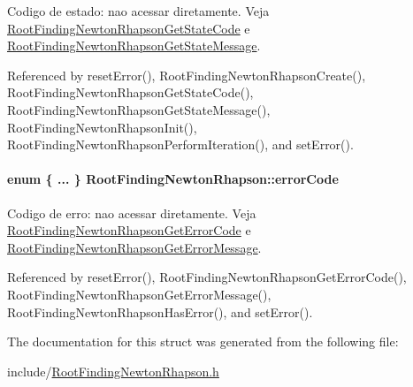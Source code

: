 Codigo de estado: nao acessar diretamente. Veja \hyperlink{group____newton_g9d87a4beccc7b61365f6b680fc1a4355}{RootFindingNewtonRhapsonGetStateCode} e \hyperlink{group____newton_g70436f650ac07866bb8d9897908f4422}{RootFindingNewtonRhapsonGetStateMessage}. 



Referenced by resetError(), RootFindingNewtonRhapsonCreate(), RootFindingNewtonRhapsonGetStateCode(), RootFindingNewtonRhapsonGetStateMessage(), RootFindingNewtonRhapsonInit(), RootFindingNewtonRhapsonPerformIteration(), and setError().\hypertarget{structRootFindingNewtonRhapson_b35a21e9345d1da0984870793a883ff9}{
\paragraph[errorCode]{\setlength{\rightskip}{0pt plus 5cm}enum \{ ... \}   {\bf RootFindingNewtonRhapson::errorCode}}\hfill}
\label{structRootFindingNewtonRhapson_b35a21e9345d1da0984870793a883ff9}


Codigo de erro: nao acessar diretamente. Veja \hyperlink{group____newton_ga8599365ab3f0770158719cdd32eb5c3}{RootFindingNewtonRhapsonGetErrorCode} e \hyperlink{group____newton_gcbbd94963ebd3ddbaf6bf4e9ce1c0a1f}{RootFindingNewtonRhapsonGetErrorMessage}. 



Referenced by resetError(), RootFindingNewtonRhapsonGetErrorCode(), RootFindingNewtonRhapsonGetErrorMessage(), RootFindingNewtonRhapsonHasError(), and setError().

The documentation for this struct was generated from the following file:\begin{CompactItemize}
\item 
include/\hyperlink{RootFindingNewtonRhapson_8h}{RootFindingNewtonRhapson.h}\end{CompactItemize}
